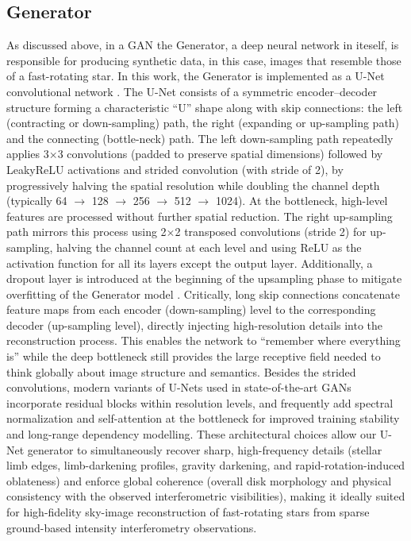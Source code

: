 \subsection{Generator}
As discussed above, in a GAN the Generator, a deep neural network in iteself, is responsible for producing synthetic data, in this case, images that resemble those of a fast-rotating star. In this work, the Generator is implemented as a U-Net convolutional network \citep{ronneberger2015u}. The U-Net consists of a symmetric encoder--decoder structure forming a characteristic ``U'' shape along with skip connections: the left (contracting or down-sampling) path, the right (expanding or up-sampling path) and the connecting (bottle-neck) path. The left down-sampling path repeatedly applies 3$\times$3 convolutions (padded to preserve spatial dimensions) followed by LeakyReLU activations and strided convolution (with stride of 2), by progressively halving the spatial resolution while doubling the channel depth (typically 64 $\to$ 128 $\to$ 256 $\to$ 512 $\to$ 1024). At the bottleneck, high-level features are processed without further spatial reduction. The right up-sampling path mirrors this process using 2$\times$2 transposed convolutions (stride 2) for up-sampling, halving the channel count at each level and using ReLU as the activation function for all its layers except the output layer. Additionally, a dropout layer is introduced at the beginning of the upsampling phase to mitigate overfitting of the Generator model \citep{isola2017image}. Critically, long skip connections concatenate feature maps from each encoder (down-sampling) level to the corresponding decoder (up-sampling level), directly injecting high-resolution details into the reconstruction process. This enables the network to ``remember where everything is'' while the deep bottleneck still provides the large receptive field needed to think globally about image structure and semantics. Besides the strided convolutions, modern variants of U-Nets used in state-of-the-art GANs incorporate residual blocks within resolution levels, and frequently add spectral normalization and self-attention at the bottleneck for improved training stability and long-range dependency modelling. These architectural choices allow our U-Net generator to simultaneously recover sharp, high-frequency details (stellar limb edges, limb-darkening profiles, gravity darkening, and rapid-rotation-induced oblateness) and enforce global coherence (overall disk morphology and physical consistency with the observed interferometric visibilities), making it ideally suited for high-fidelity sky-image reconstruction of fast-rotating stars from sparse ground-based intensity interferometry observations.

